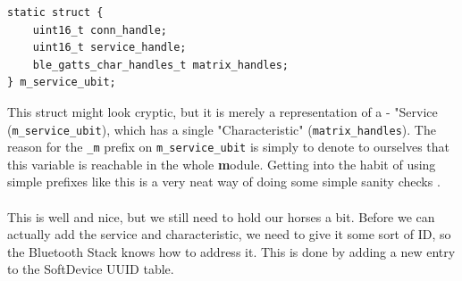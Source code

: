 \documentclass[11pt,a4paper]{article}
\begin{document}
\begin{verbatim}
static struct {
	uint16_t conn_handle;
	uint16_t service_handle;
	ble_gatts_char_handles_t matrix_handles;
} m_service_ubit;
\end{verbatim}
This struct might look cryptic, but it is merely a representation of a - "Service (\texttt{m_service_ubit}), which has a single "Characteristic" (\texttt{matrix_handles}). The reason for the \texttt{_m} prefix on \texttt{m_service_ubit} is simply to denote to ourselves that this variable is reachable in the whole \textbf{m}odule. Getting into the habit of using simple prefixes like this is a very neat way of doing some simple sanity checks .\\
\\
This is well and nice, but we still need to hold our horses a bit. Before we can actually add the service and characteristic, we need to give it some sort of ID, so the Bluetooth Stack knows how to address it. This is done by adding a new entry to the SoftDevice UUID table.
\end{document}

